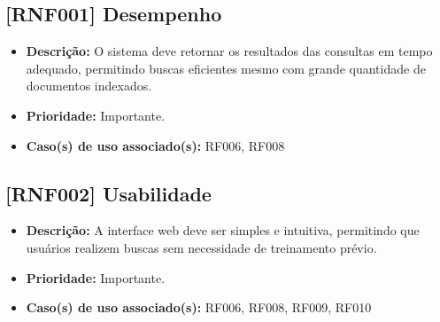 
\subsection{[RNF001] Desempenho}
 \begin{itemize}
    \item \textbf{Descrição:} O sistema deve retornar os resultados das consultas em tempo adequado, permitindo buscas eficientes mesmo com grande quantidade de documentos indexados.
    \item \textbf{Prioridade:} Importante.
    \item \textbf{Caso(s) de uso associado(s):} RF006, RF008
\end{itemize}

\subsection{[RNF002] Usabilidade}
 \begin{itemize}
    \item \textbf{Descrição:} A interface web deve ser simples e intuitiva, permitindo que usuários realizem buscas sem necessidade de treinamento prévio.
    \item \textbf{Prioridade:} Importante.
    \item \textbf{Caso(s) de uso associado(s):} RF006, RF008, RF009, RF010
\end{itemize}


